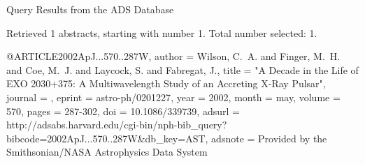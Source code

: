 Query Results from the ADS Database


Retrieved 1 abstracts, starting with number 1.  Total number selected: 1.

@ARTICLE{2002ApJ...570..287W,
   author = {{Wilson}, C.~A. and {Finger}, M.~H. and {Coe}, M.~J. and {Laycock}, S. and 
	{Fabregat}, J.},
    title = "{A Decade in the Life of EXO 2030+375: A Multiwavelength Study of an Accreting X-Ray Pulsar}",
  journal = {\apj},
   eprint = {astro-ph/0201227},
     year = 2002,
    month = may,
   volume = 570,
    pages = {287-302},
      doi = {10.1086/339739},
   adsurl = {http://adsabs.harvard.edu/cgi-bin/nph-bib_query?bibcode=2002ApJ...570..287W&db_key=AST},
  adsnote = {Provided by the Smithsonian/NASA Astrophysics Data System}
}


